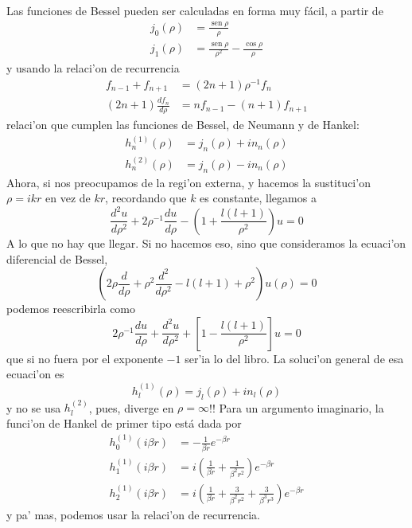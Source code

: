 Las funciones de Bessel pueden ser calculadas en forma muy f\'{a}cil, a partir
de
\begin{align*}
j_{0}\left(  \rho\right)   & =\frac{\operatorname{sen}\rho}{\rho}\\
j_{1}\left(  \rho\right)   & =\frac{\operatorname{sen}\rho}{\rho^{2}}%
-\frac{\cos\rho}{\rho}%
\end{align*}
y usando la relaci'on de recurrencia
\begin{align*}
f_{n-1}+f_{n+1}  & =\left(  2n+1\right)  \rho^{-1}f_{n}\\
\left(  2n+1\right)  \frac{df_{n}}{d\rho}  & =nf_{n-1}-\left(  n+1\right)
f_{n+1}%
\end{align*}
relaci'on que cumplen las funciones de Bessel, de Neumann y de Hankel:
\begin{align*}
h_{n}^{\left(  1\right)  }\left(  \rho\right)   & =j_{n}\left(  \rho\right)
+in_{n}\left(  \rho\right) \\
h_{n}^{\left(  2\right)  }\left(  \rho\right)   & =j_{n}\left(  \rho\right)
-in_{n}\left(  \rho\right)
\end{align*}
Ahora, si nos preocupamos de la regi'on externa, y hacemos la
sustituci'on $\rho=ikr$ en vez de $kr$, recordando que $k$ es constante,
llegamos a
\begin{equation}
\frac{d^{2}u}{d\rho^{2}}+2\rho^{-1}\frac{du}{d\rho}-\left(  1+\frac{l\left(
l+1\right)  }{\rho^{2}}\right)  u=0
\end{equation}
A lo que no hay que llegar. Si no hacemos eso, sino que consideramos la
ecuaci'on diferencial de Bessel,
\begin{equation}
\left(  2\rho\frac{d}{d\rho}+\rho^{2}\frac{d^{2}}{d\rho^{2}}-l\left(
l+1\right)  +\rho^{2}\right)  u\left(  \rho\right)  =0
\end{equation}
podemos reescribirla como
\begin{equation}
2\rho^{-1}\frac{du}{d\rho}+\frac{d^{2}u}{d\rho^{2}}+\left[  1-\frac{l\left(
l+1\right)  }{\rho^{2}}\right]  u=0
\end{equation}
que si no fuera por el exponente $-1$ ser'ia lo del libro. La soluci'on
general de esa ecuaci'on es
\begin{equation}
h_{l}^{\left(  1\right)  }\left(  \rho\right)  =j_{l}\left(  \rho\right)
+in_{l}\left(  \rho\right)
\end{equation}
y no se usa $h_{l}^{\left(  2\right)  }$, pues, \textexclamdown diverge en
$\rho=\infty$!! Para un argumento imaginario, la funci'on de Hankel de
primer tipo est\'{a} dada por
\begin{align*}
h_{0}^{\left(  1\right)  }\left(  i\beta r\right)   & =-\frac{1}{\beta
r}e^{-\beta r}\\
h_{1}^{\left(  1\right)  }\left(  i\beta r\right)   & =i\left(  \frac{1}{\beta
r}+\frac{1}{\beta^{2}r^{2}}\right)  e^{-\beta r}\\
h_{2}^{\left(  1\right)  }\left(  i\beta r\right)   & =i\left(  \frac{1}{\beta
r}+\frac{3}{\beta^{2}r^{2}}+\frac{3}{\beta^{3}r^{3}}\right)  e^{-\beta r}%
\end{align*}
y pa' mas, podemos usar la relaci'on de recurrencia.

